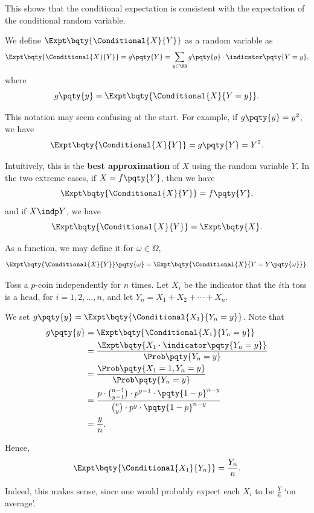 This shows that the conditional expectation is consistent with the expectation of the conditional random variable.

\begin{definition}
    \label{def:conditional-expectation-distribution}%
    We define \(\Expt\bqty{\Conditional{X}{Y}}\) as a random variable as
    \[
        \Expt\bqty{\Conditional{X}{Y}} = g\pqty{Y} = \sum_{y \in \RR} g\pqty{y} \cdot \indicator\pqty{Y = y},
    \]
    where
    \[
        g\pqty{y} = \Expt\bqty{\Conditional{X}{Y = y}}.
    \]
\end{definition}

This notation may seem confusing at the start. For example, if \(g\pqty{y} = y^2\), we have
\[
    \Expt\bqty{\Conditional{X}{Y}} = g\pqty{Y} = Y^2.
\]

Intuitively, this is the \textbf{best approximation} of \(X\) using the random variable \(Y\). In the two extreme cases, if \(X = f\pqty{Y}\), then we have
\[
    \Expt\bqty{\Conditional{X}{Y}} = f\pqty{Y},
\]
and if \(X \indp Y\), we have
\[
    \Expt\bqty{\Conditional{X}{Y}} = \Expt\bqty{X}.
\]

As a function, we may define it for \(\omega \in \Omega\),
\[
    \Expt\bqty{\Conditional{X}{Y}}\pqty{\omega} = \Expt\bqty{\Conditional{X}{Y = Y\pqty{\omega}}}.
\]

\begin{example}
    \label{ex:conditional-expectatio-tossing-p-coin}%
    Toss a \(p\)-coin independently for \(n\) times. Let \(X_i\) be the indicator that the \(i\)th toss is a head, for \(i = 1, 2, \ldots, n\), and let \(Y_n = X_1 + X_2 + \cdots + X_n\).

    We set \(g\pqty{y} = \Expt\bqty{\Conditional{X_1}{Y_n = y}}\). Note that
    \begin{align*}
        g\pqty{y} &= \Expt\bqty{\Conditional{X_1}{Y_n = y}} \\
        &= \frac{\Expt\bqty{X_1 \cdot \indicator\pqty{Y_n = y}}}{\Prob\pqty{Y_n = y}} \\
        &= \frac{\Prob\pqty{X_1 = 1, Y_n = y}}{\Prob\pqty{Y_n = y}} \\
        &= \frac{p \cdot \binom{n - 1}{y - 1} \cdot p^{y - 1} \cdot \pqty{1 - p}^{n - y}}{\binom{n}{y} \cdot p^y \cdot \pqty{1 - p}^{n - y}} \\
        &= \frac{y}{n}.
    \end{align*}

    Hence,
    \[
        \Expt\bqty{\Conditional{X_1}{Y_n}} = \frac{Y_n}{n}.
    \]

    Indeed, this makes sense, since one would probably expect each \(X_i\) to be \(\frac{Y}{n}\) `on average'.
\end{example}

